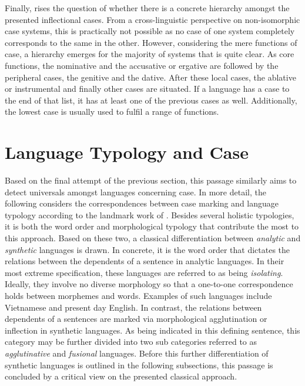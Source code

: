 \documentclass[11pt,a4paper,twoside,openright]{scrbook}
\begin{document}
Finally, \citet{blake1994case} rises the question of whether there is a concrete hierarchy amongst the presented inflectional cases. From a cross-linguistic perspective on non-isomorphic case systems, this is practically not possible as no case of one system completely corresponds to the same in the other. However, considering the mere functions of case, a hierarchy emerges for the majority of systems that is quite clear. As core functions, the nominative and the accusative or ergative are followed by the peripheral cases, the genitive and the dative. After these local cases, the ablative or instrumental and finally other cases are situated. If a language has a case to the end of that list, it has at least one of the previous cases as well. Additionally, the lowest case is usually used to fulfil a range of functions.




\section{Language Typology and Case}

Based on the final attempt of the previous section, this passage similarly aims to detect universals amongst languages concerning case. In more detail, the following considers the correspondences between case marking and language typology according to the landmark work of \citet{comrie1989typol}. Besides several holistic typologies, it is both the word order and  morphological typology that contribute the most to this approach. Based on these two, a classical differentiation between \textit{analytic} and \textit{synthetic} languages is drawn. In concrete, it is the word order that dictates the relations between the dependents of a sentence in analytic languages. In their most extreme specification, these languages are referred to as being \textit{isolating}. Ideally, they involve no diverse morphology so that a one-to-one correspondence holds between morphemes and words. Examples of such languages include Vietnamese and present day English. In contrast, the relations between dependents of a sentences are marked via morphological agglutination or inflection in synthetic languages. As being indicated in this defining sentence, this category may be further divided into two sub categories referred to as \textit{agglutinative} and \textit{fusional} languages. Before this further differentiation of synthetic languages is outlined in the following subsections, this passage is concluded by a critical view on the presented classical approach. 
\end{document}
